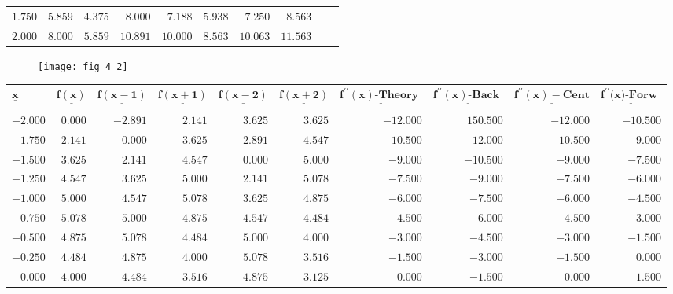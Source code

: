 \documentclass[../main.tex]{subfiles}
\begin{document}
\begin{enumerate}[label=\bfseries(\alph*)]
\begin{tabular}{rrrrrrrrrr}
$1.750$ & $5.859$ & $4.375$ & $8.000$ & $7.188$ & $5.938$ & $7.250$ & $8.563$ \\
$2.000$ & $8.000$ & $5.859$ & $10.891$ & $10.000$ & $8.563$ & $10.063$ & $11.563$ \\
\end{tabular}
\bigbreak\bigbreak\bigbreak\bigbreak\bigbreak\bigbreak
\begin{figure}[H]\quad\quad\quad\quad\quad\quad\quad
		\texttt{[image: fig\_4\_2]}
		\label{fig:fig_4_2}
	\end{figure}
\bigbreak
\hspace{-1cm}
\begin{tabular}{rrrrrrrrrr}
\multicolumn{1}{l}{$\underline{\mathbf{x}}$} & $\underline{\mathbf{f}(\mathbf{x})}$ & $\underline{\mathbf{f}(\mathbf{x}-\mathbf{1})}$ & $\underline{\mathbf{f}(\mathbf{x}+\mathbf{1})}$ & $\underline{\mathbf{f}(\mathbf{x}-\mathbf{2})}$ & $\underline{\mathbf{f}(\mathbf{x}+\mathbf{2})}$ & $\underline{\mathbf{f}^{\prime\prime}(\mathbf{x}) \textbf {-Theory }}$ & $\underline{\mathbf{f}^{\prime\prime}(\mathbf{x}) \textbf {-Back }}$ & $\underline{\mathbf{f}^{\prime\prime}(\mathbf{x})-\mathbf{C e n t}}$ & $\underline{\mathbf{{f}^{\prime\prime}(}\mathbf{{x})} \textbf {-Forw }}$ \\\\
$-2.000$ & $0.000$ & $-2.891$ & $2.141$ & $3.625$ & $3.625$ & $ -12.000$ & $150.500$ & $-12.000$ & $-10.500$\\
$-1.750$ & $2.141$ & $0.000$ & $3.625$ & $-2.891$ & $4.547$ & $-10.500$ & $-12.000$ & $-10.500$ & $-9.000$\\
$-1.500$ & $3.625$ & $2.141$ & $4.547$ & $0.000$ & $5.000$ & $-9.000$ & $-10.500$ & $-9.000$ & $-7.500$ \\
$-1.250$ & $4.547$ & $3.625$ & $5.000$ & $2.141$ & $5.078$ & $-7.500$ & $-9.000$ & $-7.500$ & $-6.000$ \\
$-1.000$ & $5.000$ & $4.547$ & $5.078$ & $3.625$ & $4.875$ & $-6.000$ & $-7.500$ & $-6.000$ & $-4.500$\\
$-0.750$ & $5.078$ & $5.000$ & $4.875$ & $4.547$ & $4.484$ & $-4.500$ & $-6.000$ & $-4.500$ & $-3.000$\\
$-0.500$ & $4.875$ & $5.078$ & $4.484$ & $5.000$ & $4.000$ & $-3.000$ & $-4.500$ & $-3.000$ & $-1.500$\\
$-0.250$ & $4.484$ & $4.875$ & $4.000$ & $5.078$ & $3.516$ & $-1.500$ & $-3.000$ & $-1.500$ & $0.000$\\
$0.000$ & $4.000$ & $4.484$ & $3.516$ & $4.875$ & $3.125$ & $0.000$ & $-1.500$ & $0.000$ & $1.500$\\

\end{tabular}
\end{enumerate}
\end{document}
